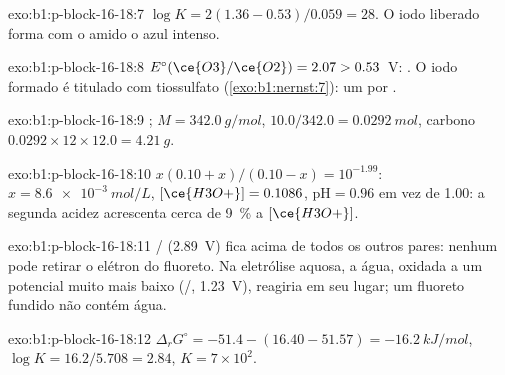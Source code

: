 \begin{solution}{exo:b1:p-block-16-18:7}
$\log K = 2(1.36 - 0.53)/0.059 = 28$. O iodo liberado forma com o amido o
 azul intenso.
\end{solution}

\begin{solution}{exo:b1:p-block-16-18:8}
$E^\circ(\ce{O3}/\ce{O2}) = 2.07 > 0.53$~V: . O iodo formado é titulado com tiossulfato
(\cref{exo:b1:nernst:7}): um  por .
\end{solution}

\begin{solution}{exo:b1:p-block-16-18:9}
; $M = \qty{342.0}{g/mol}$, $10.0/342.0 =
\qty{0.0292}{mol}$, carbono $0.0292 \times 12 \times 12.0 = \qty{4.21}{g}$.
\end{solution}

\begin{solution}{exo:b1:p-block-16-18:10}
$x(0.10 + x)/(0.10 - x) = 10^{-1.99}$: $x = \qty{8.6e-3}{mol/L}$,
$[\ce{H3O+}] = 0.1086$, $\mathrm{pH} = 0.96$ em vez de 1.00: a segunda
acidez acrescenta cerca de \qty{9}{\percent} a $[\ce{H3O+}]$.
\end{solution}

\begin{solution}{exo:b1:p-block-16-18:11}
/ (2.89~V) fica acima de todos os outros pares: nenhum
 pode retirar o elétron do fluoreto. Na eletrólise aquosa, a
água, oxidada a um potencial muito mais baixo (/, 1.23~V),
reagiria em seu lugar; um fluoreto fundido não contém água.
\end{solution}

\begin{solution}{exo:b1:p-block-16-18:12}
$\Delta_r G^\circ = -51.4 - (16.40 - 51.57) = \qty{-16.2}{kJ/mol}$,
$\log K = 16.2/5.708 = 2.84$, $K = 7 \times 10^2$.
\end{solution}


